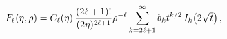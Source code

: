 \[\mathop{F_{\ell}\/}\nolimits\!\left(\eta,\rho\right)=\mathop{C_{\ell}\/}%
\nolimits\!\left(\eta\right)\frac{(2\ell+1)!}{(2\eta)^{2\ell+1}}\rho^{-\ell}\*%
\sum_{k=2\ell+1}^{\infty}b_{k}t^{k/2}\mathop{I_{k}\/}\nolimits\!\left(%
\textstyle 2\sqrt{t}\right),\]
